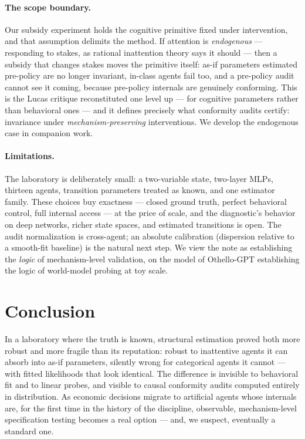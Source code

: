 \documentclass[11pt]{article}
\begin{document}
\paragraph{The scope boundary.} Our subsidy experiment holds the cognitive
primitive fixed under intervention, and that assumption delimits the method.
If attention is \emph{endogenous} --- responding to stakes, as rational
inattention theory says it should \citep{mackowiak2023} --- then a subsidy
that changes stakes moves the primitive itself: as-if parameters estimated
pre-policy are no longer invariant, in-class agents fail too, and a
pre-policy audit cannot see it coming, because pre-policy internals are
genuinely conforming. This is the Lucas critique reconstituted one level
up --- for cognitive parameters rather than behavioral ones --- and it
defines precisely what conformity audits certify: invariance under
\emph{mechanism-preserving} interventions. We develop the endogenous case
in companion work.

\paragraph{Limitations.} The laboratory is deliberately small: a
two-variable state, two-layer MLPs, thirteen agents, transition parameters
treated as known, and one estimator family. These choices buy exactness ---
closed ground truth, perfect behavioral control, full internal access ---
at the price of scale, and the diagnostic's behavior on deep networks,
richer state spaces, and estimated transitions is open. The audit
normalization is cross-agent; an absolute calibration (dispersion relative
to a smooth-fit baseline) is the natural next step. We view the note as
establishing the \emph{logic} of mechanism-level validation, on the model
of Othello-GPT establishing the logic of world-model probing at toy scale.

\section{Conclusion}\label{sec:conclusion}
In a laboratory where the truth is known, structural estimation proved both
more robust and more fragile than its reputation: robust to inattentive
agents it can absorb into as-if parameters, silently wrong for categorical
agents it cannot --- with fitted likelihoods that look identical. The
difference is invisible to behavioral fit and to linear probes, and visible
to causal conformity audits computed entirely in distribution. As economic
decisions migrate to artificial agents whose internals are, for the first
time in the history of the discipline, observable, mechanism-level
specification testing becomes a real option --- and, we suspect, eventually
a standard one.
\end{document}
